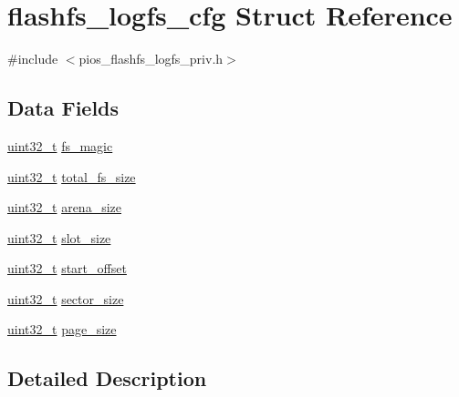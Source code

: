 \hypertarget{structflashfs__logfs__cfg}{\section{flashfs\-\_\-logfs\-\_\-cfg Struct Reference}
\label{structflashfs__logfs__cfg}
}


{\ttfamily \#include $<$pios\-\_\-flashfs\-\_\-logfs\-\_\-priv.\-h$>$}

\subsection*{Data Fields}
\begin{DoxyCompactItemize}
\item 
\hyperlink{stdint_8h_a435d1572bf3f880d55459d9805097f62}{uint32\-\_\-t} \hyperlink{group___p_i_o_s___f_l_a_s_h_f_s_ga1fe17f8582e422dfe871844653d7d6f9}{fs\-\_\-magic}
\item 
\hyperlink{stdint_8h_a435d1572bf3f880d55459d9805097f62}{uint32\-\_\-t} \hyperlink{group___p_i_o_s___f_l_a_s_h_f_s_ga36ee534fa25bdd1bece22e997e3ba800}{total\-\_\-fs\-\_\-size}
\item 
\hyperlink{stdint_8h_a435d1572bf3f880d55459d9805097f62}{uint32\-\_\-t} \hyperlink{group___p_i_o_s___f_l_a_s_h_f_s_ga838dc01d5c7c1796252597dbb2d1dc04}{arena\-\_\-size}
\item 
\hyperlink{stdint_8h_a435d1572bf3f880d55459d9805097f62}{uint32\-\_\-t} \hyperlink{group___p_i_o_s___f_l_a_s_h_f_s_gac9f1463cfe49a3b517bf6c1e44bbb087}{slot\-\_\-size}
\item 
\hyperlink{stdint_8h_a435d1572bf3f880d55459d9805097f62}{uint32\-\_\-t} \hyperlink{group___p_i_o_s___f_l_a_s_h_f_s_ga2a71336371b265bddac688b27ebcb94c}{start\-\_\-offset}
\item 
\hyperlink{stdint_8h_a435d1572bf3f880d55459d9805097f62}{uint32\-\_\-t} \hyperlink{group___p_i_o_s___f_l_a_s_h_f_s_ga8251b6447774f97389ec08c71e1ed54b}{sector\-\_\-size}
\item 
\hyperlink{stdint_8h_a435d1572bf3f880d55459d9805097f62}{uint32\-\_\-t} \hyperlink{group___p_i_o_s___f_l_a_s_h_f_s_ga28ddda808f37b1e0a2d6e8ea25c47c59}{page\-\_\-size}
\end{DoxyCompactItemize}


\subsection{Detailed Description}


